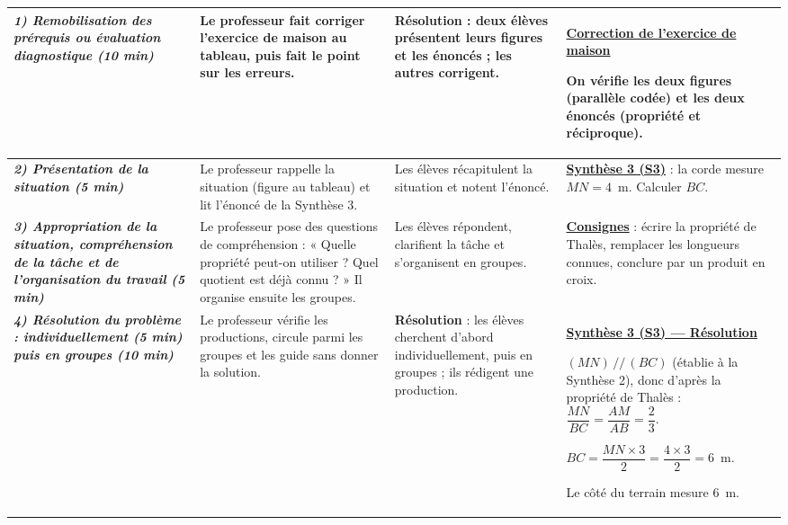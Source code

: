 \documentclass[10pt]{article}
\newcommand{\titreR}[1]{\underline{\textcolor{rougetitre}{\bfseries #1}}}
\newcommand{\seance}[1]{\fcolorbox{bleuseance}{bleufond}{\textcolor{bleuseance}{\bfseries #1}}}
\newcommand{\moment}[1]{\textbf{\itshape #1}}
\begin{document}
\begin{longtable}{|p{2.35cm}|p{5.35cm}|p{4.55cm}|p{13.85cm}|}
\hline
\seance{SEANCE 3} \newline \moment{1) Remobilisation des prérequis ou évaluation diagnostique (10 min)} &
Le professeur fait corriger l'exercice de maison au tableau, puis fait le point sur les erreurs. &
\textbf{Résolution} : deux élèves présentent leurs figures et les énoncés ; les
autres corrigent. &
\titreR{Correction de l'exercice de maison} \par
On vérifie les deux figures (parallèle codée) et les deux énoncés (propriété et réciproque). \\ \hline

\moment{2) Présentation de la situation (5 min)} &
Le professeur rappelle la situation  (figure au tableau) et lit l'énoncé de la Synthèse 3. &
Les élèves récapitulent la situation et notent l'énoncé. &
\titreR{Synthèse 3 (S3)} : la corde mesure $MN=4$~m. Calculer $BC$. \\ \hline

\moment{3) Appropriation de la situation, compréhension de la tâche et de
l'organisation du travail (5 min)} &
Le professeur pose des questions de compréhension : « Quelle propriété peut-on utiliser ? Quel quotient est déjà connu ? » Il organise ensuite les groupes. &
Les élèves répondent, clarifient la tâche et s'organisent en groupes. &
\titreR{Consignes} : écrire la propriété de Thalès, remplacer les longueurs
connues, conclure par un produit en croix. \\ \hline

\moment{4) Résolution du problème : individuellement (5 min) puis en groupes (10 min)} &
Le professeur vérifie les productions, circule parmi les groupes et les guide sans donner la solution. &
\textbf{Résolution} : les élèves cherchent d'abord individuellement, puis en groupes ; ils rédigent une production. &
\titreR{Synthèse 3 (S3) — Résolution} \par
$(MN)\,//\,(BC)$ (établie à la Synthèse 2), donc d'après la propriété de Thalès : \;
$\dfrac{MN}{BC}=\dfrac{AM}{AB}=\dfrac{2}{3}$. \par
$BC=\dfrac{MN\times3}{2}=\dfrac{4\times3}{2}=6$~m. \par
Le côté du terrain mesure $6$~m. \\ \hline


\end{longtable}
\end{document}

